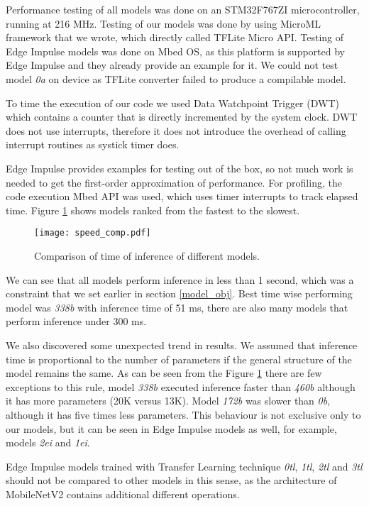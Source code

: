 Performance testing of all models was done on an STM32F767ZI microcontroller, running at 216 \si{\mega\hertz}.
Testing of our models was done by using MicroML framework that we wrote, which directly called TFLite Micro API.
Testing of Edge Impulse models was done on Mbed OS, as this platform is supported by Edge Impulse and they already provide an example for it.
We could not test model \textit{0a} on device as TFLite converter failed to produce a compilable model.

To time the execution of our code we used Data Watchpoint Trigger (DWT) which contains a counter that is directly incremented by the system clock.
DWT does not use interrupts, therefore it does not introduce the overhead of calling interrupt routines as systick timer does.


Edge Impulse provides examples for testing out of the box, so not much work is needed to get the first-order approximation of performance.
For profiling, the code execution Mbed API was used, which uses timer interrupts to track elapsed time.
Figure \ref{speed_comp} shows models ranked from the fastest to the slowest.

\begin{figure}[ht]
    \centering
    \texttt{[image: speed\_comp.pdf]}
    \caption{ Comparison of time of inference of different models.}
    \label{speed_comp}
\end{figure}

We can see that all models perform inference in less than 1 second, which was a constraint that we set earlier in section \ref{model_obj}.
Best time wise performing model was \textit{338b} with inference time of 51 \si{\milli\second}, there are also many models that perform inference under 300 \si{\milli\second}.

We also discovered some unexpected trend in results.
We assumed that inference time is proportional to the number of parameters if the general structure of the model remains the same.
As can be seen from the Figure \ref{speed_comp} there are few exceptions to this rule, model \textit{338b} executed inference faster than \textit{460b} although it has more parameters (20K versus 13K).
Model \textit{172b} was slower than \textit{0b}, although it has five times less parameters.
This behaviour is not exclusive only to our models, but it can be seen in Edge Impulse models as well, for example, models \textit{2ei} and \textit{1ei}.

Edge Impulse models trained with Transfer Learning technique \textit{0tl}, \textit{1tl}, \textit{2tl} and \textit{3tl} should not be compared to other models in this sense, as the architecture of MobileNetV2 contains additional different operations.

